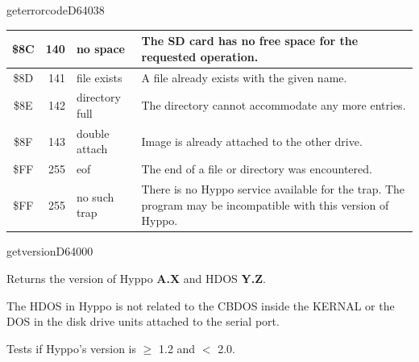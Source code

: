 \begin{hyppotrap}{geterrorcode}{D640}{38}
{\begin{longtable}{|c|r|l|p{8cm}|}
    \\\hline
    \index{Hyppo Error Codes!\$8C}
    \$8C & 140 & no space &
    The SD card has no free space for the requested operation.
    \\\hline
    \index{Hyppo Error Codes!\$8D}
    \$8D & 141 & file exists &
    A file already exists with the given name.
    \\\hline
    \index{Hyppo Error Codes!\$8E}
    \$8E & 142 & directory full &
    The directory cannot accommodate any more entries.
    \\\hline
    \index{Hyppo Error Codes!\$8F}
    \$8F & 143 & double attach &
    Image is already attached to the other drive.
    \\\hline
    \index{Hyppo Error Codes!\$FF}
    \$FF & 255 & eof &
    The end of a file or directory was encountered.
    \\\hline
    \index{Hyppo Error Codes!\$FF}
    \$FF & 255 & no such trap &
    There is no Hyppo service available for the trap. The program may be
    incompatible with this version of Hyppo.
    \\\hline
  \end{longtable}
}
\end{hyppotrap}


\newpage
\begin{hyppotrap}{getversion}{D640}{00}
\item [Service:]
  Returns the version of Hyppo \textbf{A.X} and HDOS \textbf{Y.Z}.
\item [Outputs:]
\item [History:]
\item [Remarks:]
  The HDOS in Hyppo is not related to the CBDOS inside the KERNAL or the
  DOS in the disk drive units attached to the serial port.
\item [Example:]
  Tests if Hyppo's version is $\geq$ 1.2 and $<$ 2.0.
\end{hyppotrap}


